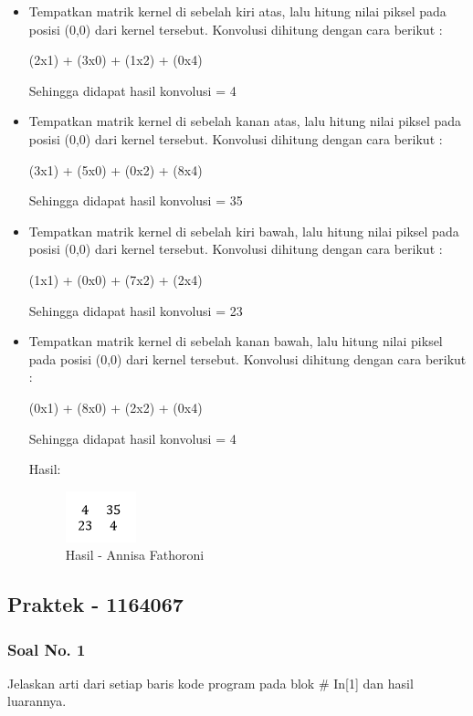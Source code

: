 \begin{itemize}
\item  Tempatkan matrik kernel di sebelah kiri atas, lalu hitung nilai piksel pada posisi (0,0) dari kernel tersebut. Konvolusi dihitung dengan cara berikut :

(2x1) + (3x0) + (1x2) + (0x4)

Sehingga didapat hasil konvolusi = 4

\item Tempatkan matrik kernel di sebelah kanan atas, lalu hitung nilai piksel pada posisi (0,0) dari kernel tersebut. Konvolusi dihitung dengan cara berikut :

(3x1) + (5x0) + (0x2) + (8x4)

Sehingga didapat hasil konvolusi = 35

\item Tempatkan matrik kernel di sebelah kiri bawah, lalu hitung nilai piksel pada posisi (0,0) dari kernel tersebut. Konvolusi dihitung dengan cara berikut :

(1x1) + (0x0) + (7x2) + (2x4)

Sehingga didapat hasil konvolusi = 23

\item Tempatkan matrik kernel di sebelah kanan bawah, lalu hitung nilai piksel pada posisi (0,0) dari kernel tersebut. Konvolusi dihitung dengan cara berikut :

(0x1) + (8x0) + (2x2) + (0x4)

Sehingga didapat hasil konvolusi = 4

Hasil:

\begin{figure}[!hbtp]
\centering
\includegraphics[scale=0.8]{figures/Chapter 7/1164067/Teori/Chapter7AnnisaFathoroni10.png}
\caption{Hasil - Annisa Fathoroni}
\label{Hasil - Annisa Fathoroni}
\end{figure}

\end{itemize}

\subsection{Praktek - 1164067}
\subsubsection{Soal No. 1}
Jelaskan arti dari setiap baris kode program pada blok \# In[1] dan hasil luarannya.


